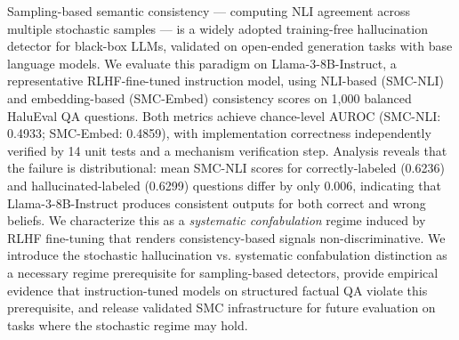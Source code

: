 
Sampling-based semantic consistency --- computing NLI agreement across multiple stochastic samples --- is a widely adopted training-free hallucination detector for black-box LLMs, validated on open-ended generation tasks with base language models. We evaluate this paradigm on Llama-3-8B-Instruct, a representative RLHF-fine-tuned instruction model, using NLI-based (SMC-NLI) and embedding-based (SMC-Embed) consistency scores on 1,000 balanced HaluEval QA questions. Both metrics achieve chance-level AUROC (SMC-NLI: 0.4933; SMC-Embed: 0.4859), with implementation correctness independently verified by 14 unit tests and a mechanism verification step. Analysis reveals that the failure is distributional: mean SMC-NLI scores for correctly-labeled (0.6236) and hallucinated-labeled (0.6299) questions differ by only 0.006, indicating that Llama-3-8B-Instruct produces consistent outputs for both correct and wrong beliefs. We characterize this as a \textit{systematic confabulation} regime induced by RLHF fine-tuning that renders consistency-based signals non-discriminative. We introduce the stochastic hallucination vs. systematic confabulation distinction as a necessary regime prerequisite for sampling-based detectors, provide empirical evidence that instruction-tuned models on structured factual QA violate this prerequisite, and release validated SMC infrastructure for future evaluation on tasks where the stochastic regime may hold.

